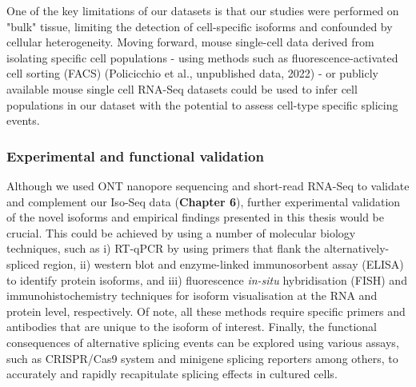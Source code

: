 One of the key limitations of our datasets is that our studies were performed on "bulk" tissue, limiting the detection of cell-specific isoforms and confounded by cellular heterogeneity. Moving forward, mouse single-cell data derived from isolating specific cell populations - using methods such as fluorescence-activated cell sorting (FACS) (Policicchio  et al., unpublished data, 2022) - or publicly available mouse single cell RNA-Seq datasets could be used to infer cell populations in our dataset with the potential to assess cell-type specific splicing events.   

\subsubsection{Experimental and functional validation}
Although we used ONT nanopore sequencing and short-read RNA-Seq to validate and complement our Iso-Seq data (\textbf{Chapter 6}), further experimental validation of the novel isoforms and empirical findings presented in this thesis would be crucial. This could be achieved by using a number of molecular biology techniques, such as i) RT-qPCR by using primers that flank the alternatively-spliced region, ii) western blot and enzyme-linked immunosorbent assay (ELISA) to identify protein isoforms, and iii) fluorescence \textit{in-situ} hybridisation (FISH) and immunohistochemistry techniques for isoform visualisation at the RNA and protein level, respectively. Of note, all these methods require specific primers and antibodies that are unique to the isoform of interest. Finally, the functional consequences of alternative splicing events can be explored using various assays, such as CRISPR/Cas9 system and minigene splicing reporters among others, to accurately and rapidly recapitulate splicing effects in cultured cells.  



